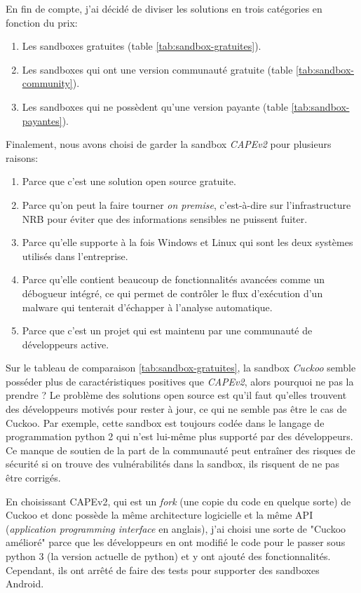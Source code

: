 En fin de compte, j'ai décidé de diviser les solutions en trois catégories en fonction du prix:
\begin{enumerate}
    \item Les sandboxes gratuites (table \ref{tab:sandbox-gratuites}).
    \item Les sandboxes qui ont une version communauté gratuite (table \ref{tab:sandbox-community}).
    \item Les sandboxes qui ne possèdent qu'une version payante (table \ref{tab:sandbox-payantes}).
\end{enumerate}

Finalement, nous avons choisi de garder la sandbox \textit{CAPEv2} pour plusieurs raisons:
\begin{enumerate}
    \item Parce que c'est une solution open source gratuite.
    \item Parce qu'on peut la faire tourner \textit{on premise}, c'est-à-dire sur l'infrastructure NRB pour éviter que des informations sensibles ne puissent fuiter.
    \item Parce qu'elle supporte à la fois Windows et Linux qui sont les deux systèmes utilisés dans l'entreprise.
    \item Parce qu'elle contient beaucoup de fonctionnalités avancées comme un débogueur intégré, ce qui permet de contrôler le flux d'exécution d'un malware qui tenterait d'échapper à l'analyse automatique.
    \item Parce que c'est un projet qui est maintenu par une communauté de développeurs active.
\end{enumerate}

Sur le tableau de comparaison \ref{tab:sandbox-gratuites}, la sandbox \textit{Cuckoo} semble posséder plus de caractéristiques positives que \textit{CAPEv2}, alors pourquoi ne pas la prendre ? Le problème des solutions open source est qu'il faut qu'elles trouvent des développeurs motivés pour rester à jour, ce qui ne semble pas être le cas de Cuckoo. Par exemple, cette sandbox est toujours codée dans le langage de programmation python 2 qui n'est lui-même plus supporté par des développeurs. Ce manque de soutien de la part de la communauté peut entraîner des risques de sécurité si on trouve des vulnérabilités dans la sandbox, ils risquent de ne pas être corrigés.

En choisissant CAPEv2, qui est un \textit{fork} (une copie du code en quelque sorte) de Cuckoo et donc possède la même architecture logicielle et la même API (\textit{application programming interface} en anglais), j'ai choisi une sorte de "Cuckoo amélioré" parce que les développeurs en ont modifié le code pour le passer sous python 3 (la version actuelle de python) et y ont ajouté des fonctionnalités. Cependant, ils ont arrêté de faire des tests pour supporter des sandboxes Android.

